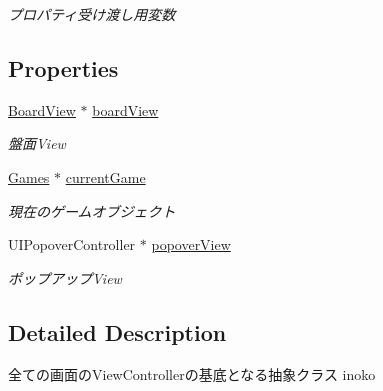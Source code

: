 \begin{DoxyCompactItemize}
\begin{DoxyCompactList}\small\item\em プロパティ受け渡し用変数 \end{DoxyCompactList}\end{DoxyCompactItemize}
\subsection*{Properties}
\begin{DoxyCompactItemize}
\item 
\hypertarget{interface_abstract_record_view_controller_a73727ead0409dad02e0785f8e3fcac5e}{
\hyperlink{interface_board_view}{BoardView} $\ast$ \hyperlink{interface_abstract_record_view_controller_a73727ead0409dad02e0785f8e3fcac5e}{boardView}}
\label{interface_abstract_record_view_controller_a73727ead0409dad02e0785f8e3fcac5e}

\begin{DoxyCompactList}\small\item\em 盤面View \end{DoxyCompactList}\item 
\hypertarget{interface_abstract_record_view_controller_a340c4197ab534a13a4bfdc6681486092}{
\hyperlink{interface_games}{Games} $\ast$ \hyperlink{interface_abstract_record_view_controller_a340c4197ab534a13a4bfdc6681486092}{currentGame}}
\label{interface_abstract_record_view_controller_a340c4197ab534a13a4bfdc6681486092}

\begin{DoxyCompactList}\small\item\em 現在のゲームオブジェクト \end{DoxyCompactList}\item 
\hypertarget{interface_abstract_record_view_controller_a7e8eab3134a3d4178d9c95782314efe0}{
UIPopoverController $\ast$ \hyperlink{interface_abstract_record_view_controller_a7e8eab3134a3d4178d9c95782314efe0}{popoverView}}
\label{interface_abstract_record_view_controller_a7e8eab3134a3d4178d9c95782314efe0}

\begin{DoxyCompactList}\small\item\em ポップアップView \end{DoxyCompactList}\end{DoxyCompactItemize}


\subsection{Detailed Description}
全ての画面のViewControllerの基底となる抽象クラス  inoko 


